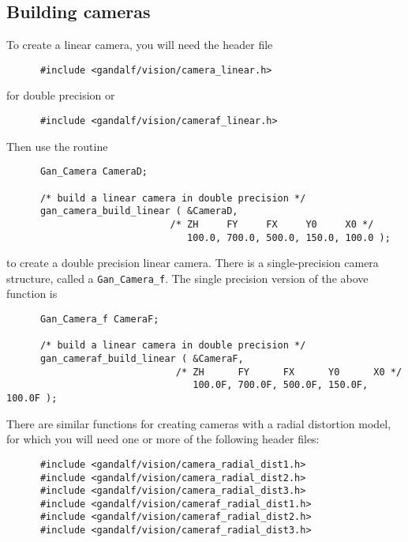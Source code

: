\subsection{Building cameras}
To create a linear camera, you will need the header file
\begin{verbatim}
      #include <gandalf/vision/camera_linear.h>
\end{verbatim}
for double precision or
\begin{verbatim}
      #include <gandalf/vision/cameraf_linear.h>
\end{verbatim}
Then use the routine
\begin{verbatim}
      Gan_Camera CameraD;

      /* build a linear camera in double precision */
      gan_camera_build_linear ( &CameraD,
                             /* ZH     FY     FX     Y0     X0 */
                                100.0, 700.0, 500.0, 150.0, 100.0 );
\end{verbatim}
to create a double precision linear camera.
There is a single-precision camera structure, called
a {\tt Gan\_Camera\_f}. The single precision version of the above function is
\begin{verbatim}
      Gan_Camera_f CameraF;

      /* build a linear camera in double precision */
      gan_cameraf_build_linear ( &CameraF,
                              /* ZH      FY      FX      Y0      X0 */
                                 100.0F, 700.0F, 500.0F, 150.0F, 100.0F );
\end{verbatim}
There are similar functions for creating cameras with a radial distortion
model, for which you will need one or more of the following header files:
\begin{verbatim}
      #include <gandalf/vision/camera_radial_dist1.h>
      #include <gandalf/vision/camera_radial_dist2.h>
      #include <gandalf/vision/camera_radial_dist3.h>
      #include <gandalf/vision/cameraf_radial_dist1.h>
      #include <gandalf/vision/cameraf_radial_dist2.h>
      #include <gandalf/vision/cameraf_radial_dist3.h>
\end{verbatim}


